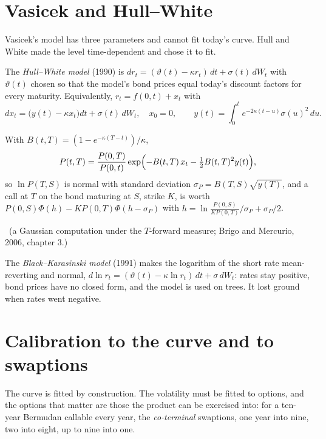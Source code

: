 \section{Vasicek and Hull--White}

Vasicek's model has three parameters and cannot fit today's curve. Hull and
White made the level time-dependent and chose it to fit.

\begin{definition}\label{def:rc:short-rate-models:hw}
The \emph{Hull--White model} (1990) is
$dr_t = (\vartheta(t)-\kappa r_t)\,dt+\sigma(t)\,dW_t$ with $\vartheta(t)$ chosen so
that the model's bond prices equal today's discount factors for every maturity.
Equivalently, $r_t = f(0,t)+x_t$ with
\[
dx_t = \bigl(y(t)-\kappa x_t\bigr)dt+\sigma(t)\,dW_t,\quad x_0=0,\qquad
y(t) = \int_0^te^{-2\kappa(t-u)}\sigma(u)^2\,du .
\]
\end{definition}

\begin{proposition}\label{prop:rc:short-rate-models:hwbond}
With $B(t,T) = (1-e^{-\kappa(T-t)})/\kappa$,
\[
P(t,T) = \frac{P(0,T)}{P(0,t)}\exp\Bigl(-B(t,T)\,x_t-\tfrac12B(t,T)^2y(t)\Bigr),
\]
so $\ln P(T,S)$ is normal with standard deviation $\sigma_P = B(T,S)\sqrt{y(T)}$, and a
call at $T$ on the bond maturing at $S$, strike $K$, is worth
$P(0,S)\Phi(h)-KP(0,T)\Phi(h-\sigma_P)$ with $h = \ln\frac{P(0,S)}{KP(0,T)}/\sigma_P+\sigma_P/2$.
\end{proposition}
\admitted\ (a Gaussian computation under the $T$-forward measure; Brigo and
Mercurio, 2006, chapter 3.)

\begin{definition}\label{def:rc:short-rate-models:bk}
The \emph{Black--Karasinski model} (1991) makes the
logarithm of the short rate mean-reverting and normal, $d\ln r_t =
(\vartheta(t)-\kappa\ln r_t)\,dt+\sigma\,dW_t$: rates stay positive, bond prices have no
closed form, and the model is used on trees. It lost ground when rates went
negative.
\end{definition}

\section{Calibration to the curve and to swaptions}

The curve is fitted by construction. The volatility must be fitted to options,
and the options that matter are those the product can be exercised into: for a
ten-year Bermudan callable every year, the \emph{co-terminal} swaptions, one year
into nine, two into eight, up to nine into one.


